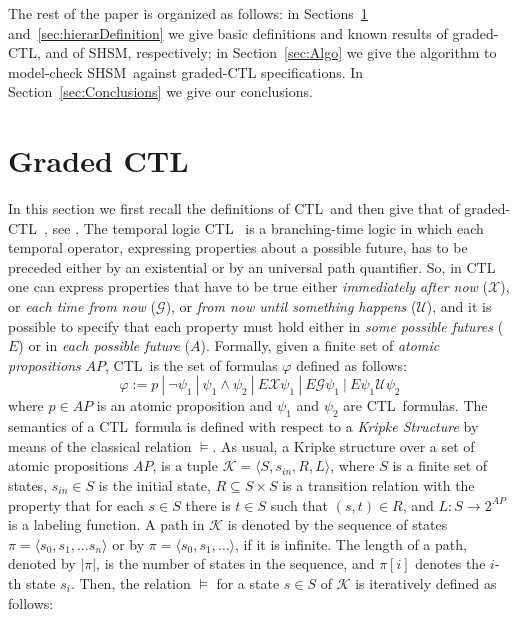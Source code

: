 \documentclass[letterpaper,twocolumn,10pt]{article}
\def    \ctl        {\mbox{\textsc{CTL }\xspace}}
\def    \CTL        {\mbox{\textsc{CTL }\xspace}}
\def    \U          {\mathcal{U}}
\def    \G          {\mathcal{G}}
\def    \X          {\mathcal{X}}
\def    \K          {\mathcal{K}}
\newcommand{\VHSM}{SHSM}
\begin{document}
The rest of the paper is organized as follows:
in Sections~\ref{sec:gradedDefinition}
and~\ref{sec:hierarDefinition}
we give basic definitions and known results
of graded-CTL, and of SHSM, respectively;
in Section~\ref{sec:Algo} we give the algorithm to model-check \VHSM\
against graded-CTL  specifications.
In Section~\ref{sec:Conclusions} we give our conclusions.

\section{Graded \CTL}\label{sec:gradedDefinition}
In this section we first recall the definitions of \ctl and then give that of
graded-\ctl,
see \cite{FNP08}.
The temporal logic \ctl \cite{CE82} is a branching-time logic in
which each temporal operator, expressing properties about a
possible future, has to be preceded either by an  existential or
by an universal path quantifier. So, in \ctl
one can express properties that have to be true either
\emph{immediately after now} ($\X$), or \emph{each time from now}
($\G$), or \emph{from now until something happens} ($\U$), and it
is possible to specify that each property must hold either in
\emph{some possible futures} ($E$) or in \emph{each possible
future} ($A$). Formally, given a finite set of \emph{atomic
propositions} $AP$, \ctl is the set of formulas
$\varphi$ defined as follows:
    $$\varphi := p\ |\ \neg\psi_1\ |\ \psi_1 \wedge \psi_2\ |\ E \X \psi_1\ |\ E \G \psi_1\ |\ E \psi_1 \U \psi_2$$
where $p \in AP$ is an atomic proposition and $\psi_1$ and
$\psi_2$ are \ctl formulas.
The semantics of a \ctl formula is defined with respect to a
\emph{Kripke Structure} by means of the classical relation
$\models$. As usual, a Kripke structure over a set of atomic
propositions $AP$, is a tuple  $\K = \langle S, s_{in}, R, L
\rangle$, where $S$ is a finite set of states, $s_{in} \in S$ is
the initial state, $R \subseteq S \times S$ is a transition
relation with the property that for each $s \in S$ there is $t \in
S$ such that $(s,t) \in R$, and $L : S \rightarrow 2^{AP}$ is a
labeling function.
A path in $\K$ is denoted by the sequence of states $\pi = \langle
s_0, s_1, \ldots s_n\rangle$ or by $\pi = \langle s_0, s_1, \ldots
\rangle$, if it is infinite. The length of a path, denoted by
$|\pi|$, is the number of states in the sequence, and $\pi[i]$
denotes the $i$-th state $s_i$.
Then, the relation $\models$ for a state $s \in S$ of $\K$ is
iteratively defined as follows:
\end{document}
